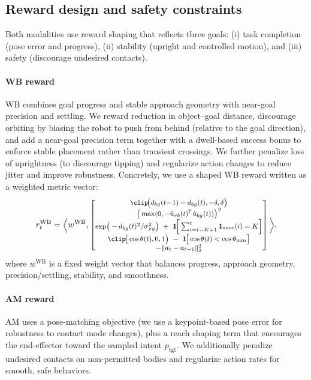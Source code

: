 \subsection{Reward design and safety constraints}
\label{sec:reward}
Both modalities use reward shaping that reflects three goals: (i) task completion (pose error and progress),
(ii) stability (upright and controlled motion), and (iii) safety (discourage undesired contacts).




\paragraph{WB reward}
WB combines goal progress and stable approach geometry with near-goal precision and settling.
We reward reduction in object--goal distance, discourage orbiting by biasing the robot to push from behind (relative to the goal direction),
and add a near-goal precision term together with a dwell-based success bonus to enforce stable placement rather than transient crossings.
We further penalize loss of uprightness (to discourage tipping) and regularize action changes to reduce jitter and improve robustness.
Concretely, we use a shaped WB reward written as a weighted metric vector:
\begin{equation}
\footnotesize
\label{eq:wb_reward_condensed}
r_t^{\mathrm{WB}}=
\Big\langle
w^{\mathrm{WB}},
\begin{bmatrix}
\clip\!\big(d_{bg}(t\!-\!1)-d_{bg}(t),-\delta,\delta\big)\\[0.1em]
\big(\max(0,-\hat u_{rb}(t)^{\!\top}\hat u_{bg}(t))\big)^2\\[0.1em]
\exp\!\big(-d_{bg}(t)^2/\sigma_{xy}^2\big)\ +\ \mathbf{1}\!\Big[\sum_{i=t-K+1}^{t}\mathbf{1}_{\text{succ}}(i)=K\Big]\\[0.1em]
\clip\!\big(\cos\theta(t),0,1\big)\ -\ \mathbf{1}\!\big[\cos\theta(t)<\cos\theta_{\min}\big]\\[0.1em]
-\|a_t-a_{t-1}\|_2^2
\end{bmatrix}
\Big\rangle ,
\end{equation}
\noindent where $w^{\mathrm{WB}}$ is a fixed weight vector that balances progress, approach geometry, precision/settling, stability, and smoothness.




\paragraph{AM reward}
AM uses a pose-matching objective (we use a keypoint-based pose error for robustness to contact mode changes),
plus a reach shaping term that encourages the end-effector toward the sampled intent $p_{\text{tgt}}$.
We additionally penalize undesired contacts on non-permitted bodies and regularize action rates for smooth, safe behaviors.





